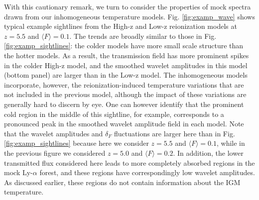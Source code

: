 With this cautionary remark, we turn to consider the properties of mock spectra drawn from our inhomogeneous temperature models.
Fig. \ref{fig:examp_wave} shows typical example sightlines from the High-z and Low-z reionization models at $z=5.5$ and $\langle F \rangle=0.1$. The trends
are broadly similar to those 
in Fig. \ref{fig:examp_sightlines}: the colder models have more small scale structure than the hotter models. As a result, the transmission
field has more prominent spikes in the colder High-z model, and the smoothed wavelet amplitudes in this model (bottom panel) are 
larger than in the Low-z model. 
The inhomogeneous
models incorporate, however, the reionization-induced temperature variations that are not included in the previous model, although the impact of
these variations are generally hard to discern by eye. One can however identify that the prominent cold region in the middle of this sightline,
for example, corresponds to a pronounced peak in the smoothed wavelet amplitude field in each model. Note that the wavelet amplitudes and $\delta_F$
fluctuations are larger here than in Fig. \ref{fig:examp_sightlines} because here we consider $z=5.5$ and $\langle F \rangle=0.1$, while in the previous figure
we considered $z=5.0$ and $\langle F \rangle=0.2$. In addition, the lower transmitted flux considered here leads to more completely absorbed
regions in the mock Ly-$\alpha$ forest, and these regions have correspondingly low wavelet amplitudes. As discussed earlier, these regions do not
contain information about the IGM temperature. 



